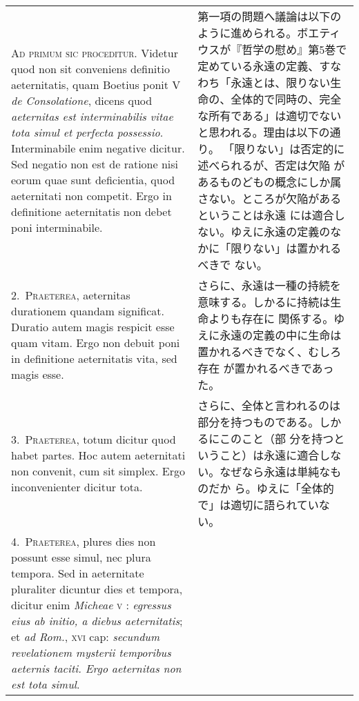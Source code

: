 \documentclass[10pt]{jsarticle} %
\begin{document}
\begin{longtable}{p{21em}p{21em}}
{\huge A}{\scshape d primum sic proceditur}. Videtur quod non sit conveniens definitio
aeternitatis, quam Boetius ponit V {\it de Consolatione}, dicens quod
{\it aeternitas est interminabilis vitae tota simul et perfecta
possessio}. Interminabile enim negative dicitur. Sed negatio non est de
ratione nisi eorum quae sunt deficientia, quod aeternitati non
competit. Ergo in definitione aeternitatis non debet poni interminabile.

&

第一項の問題へ議論は以下のように進められる。ボエティウスが『哲学の慰め』第5巻で
定めている永遠の定義、すなわち「永遠とは、限りない生命の、全体的で同時の、完全な所有である」は適切でないと思われる。理由は以下の通り。
「限りない」は否定的に述べられるが、否定は欠陥
があるものどもの概念にしか属さない。ところが欠陥があるということは永遠
には適合しない。ゆえに永遠の定義のなかに「限りない」は置かれるべきで
ない。

\\

2.~{\scshape Praeterea}, aeternitas durationem quandam significat. Duratio autem
magis respicit esse quam vitam. Ergo non debuit poni in definitione
aeternitatis vita, sed magis esse.

&

さらに、永遠は一種の持続を意味する。しかるに持続は生命よりも存在に
関係する。ゆえに永遠の定義の中に生命は置かれるべきでなく、むしろ存在
が置かれるべきであった。

\\


3.~{\scshape Praeterea}, totum dicitur quod habet partes. Hoc autem aeternitati
non convenit, cum sit simplex. Ergo inconvenienter dicitur tota.

&

さらに、全体と言われるのは部分を持つものである。しかるにこのこと（部
分を持つということ）は永遠に適合しない。なぜなら永遠は単純なものだか
ら。ゆえに「全体的で」は適切に語られていない。

\\

4.~{\scshape Praeterea}, plures dies non possunt esse simul, nec plura
tempora. Sed in aeternitate pluraliter dicuntur dies et tempora, dicitur
enim {\it Micheae} {\scshape v} : {\itshape egressus eius ab initio, a
diebus aeternitatis}; et {\it ad Rom.}, {\scshape xvi} cap: {\itshape
secundum revelationem mysterii temporibus aeternis taciti. Ergo
aeternitas non est tota simul}.



\end{longtable}
\end{document}
